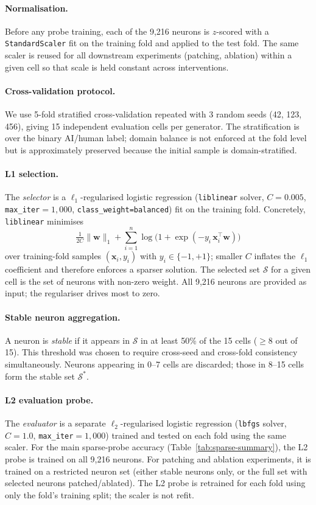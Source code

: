 \documentclass[11pt]{article}
\begin{document}
\paragraph{Normalisation.}
Before any probe training, each of the 9,216 neurons is $z$-scored with a \texttt{StandardScaler} fit on the training fold and applied to the test fold. The same scaler is reused for all downstream experiments (patching, ablation) within a given cell so that scale is held constant across interventions.

\paragraph{Cross-validation protocol.}
We use 5-fold stratified cross-validation repeated with 3 random seeds (42, 123, 456), giving 15 independent evaluation cells per generator. The stratification is over the binary AI/human label; domain balance is not enforced at the fold level but is approximately preserved because the initial sample is domain-stratified.

\paragraph{L1 selection.}
The \emph{selector} is a $\ell_1$-regularised logistic regression (\texttt{liblinear} solver, $C=0.005$, \texttt{max\_iter}$=1{,}000$, \texttt{class\_weight=balanced}) fit on the training fold. Concretely, \texttt{liblinear} minimises
\[
  \tfrac{1}{2C}\|\mathbf{w}\|_1
  + \sum_{i=1}^{n} \log\!\bigl(1 + \exp(-y_i\, \mathbf{x}_i^{\top}\mathbf{w})\bigr)
\]
over training-fold samples $(\mathbf{x}_i, y_i)$ with $y_i \in \{-1, +1\}$; smaller $C$ inflates the $\ell_1$ coefficient and therefore enforces a sparser solution. The selected set $\mathcal{S}$ for a given cell is the set of neurons with non-zero weight. All 9{,}216 neurons are provided as input; the regulariser drives most to zero.

\paragraph{Stable neuron aggregation.}
A neuron is \emph{stable} if it appears in $\mathcal{S}$ in at least 50\% of the 15 cells ($\geq 8$ out of 15). This threshold was chosen to require cross-seed and cross-fold consistency simultaneously. Neurons appearing in 0--7 cells are discarded; those in 8--15 cells form the stable set $\mathcal{S}^{*}$.

\paragraph{L2 evaluation probe.}
The \emph{evaluator} is a separate $\ell_2$-regularised logistic regression (\texttt{lbfgs} solver, $C=1.0$, \texttt{max\_iter}$=1{,}000$) trained and tested on each fold using the same scaler. For the main sparse-probe accuracy (Table~\ref{tab:sparse-summary}), the L2 probe is trained on all 9,216 neurons. For patching and ablation experiments, it is trained on a restricted neuron set (either stable neurons only, or the full set with selected neurons patched/ablated). The L2 probe is retrained for each fold using only the fold's training split; the scaler is not refit.
\end{document}
